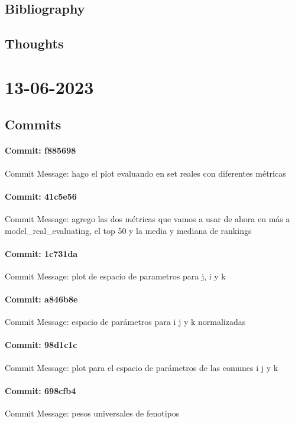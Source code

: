\documentclass{article}
\begin{document}
\subsection{Bibliography}
\subsection{Thoughts}

\section{13-06-2023}
\subsection{Commits}
\paragraph{Commit: f885698}
Commit Message: hago el plot evaluando en set reales con diferentes métricas

\paragraph{Commit: 41c5e56}
Commit Message: agrego las dos métricas que vamos a usar de ahora en más a model_real_evaluating, el top 50 y la media y mediana de rankings

\paragraph{Commit: 1c731da}
Commit Message: plot de espacio de parametros para j, i y k

\paragraph{Commit: a846b8e}
Commit Message: espacio de parámetros para i j y k normalizadas

\paragraph{Commit: 98d1c1c}
Commit Message: plot para el espacio de parámetros de las comunes i j y k

\paragraph{Commit: 698cfb4}
Commit Message: pesos universales de fenotipos
\end{document}
